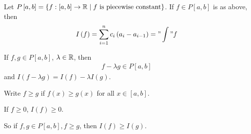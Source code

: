 \documentclass[a4paper]{article}
\begin{document}

Let $P\left[a,b\right] = \left\{ f:\left[a,b\right] \to \mathbb{R} \mid f \text{ is piecewise constant} \right\}$. If $f \in P\left[a,b\right]$ is as above, then
\begin{equation*}
\begin{aligned}
I\left(f\right) = \sum_{i=1}^n c_i \left(a_i - a_{i-1}\right) = "\int" f
\end{aligned}
\end{equation*}

\begin{lemma}
If $f,g \in P\left[a,b\right]$, $\lambda \in \mathbb{R}$, then
\begin{equation*}
\begin{aligned}
f-\lambda g \in P\left[a,b\right]
\end{aligned}
\end{equation*}
and $I\left(f-\lambda g\right) = I\left(f\right) - \lambda I\left(g\right)$.
\end{lemma}

Write $f\geq g$ if $f\left(x\right) \geq g\left(x\right)$ for all $x\in\left[a,b\right]$.

\begin{lemma}
If $f\geq 0$, $I\left(f\right) \geq 0$.
\end{lemma}

So if $f,g\in P\left[a,b\right], f\geq g$, then $I\left(f\right) \geq I\left(g\right)$.
\end{document}
